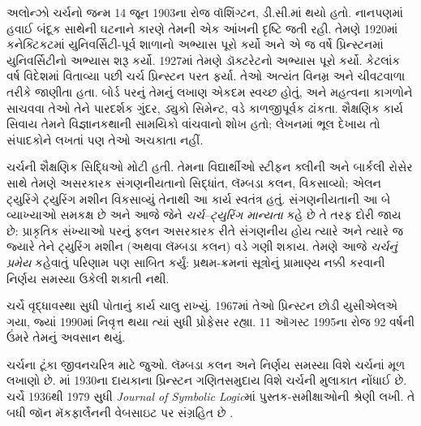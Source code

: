 \documentclass[../../../include/open-logic-section]{subfiles}
\begin{document}



અલોન્ઝો ચર્ચનો જન્મ 14 જૂન 1903ના રોજ
વૉશિંગ્ટન, ડી.સી.માં થયો હતો. નાનપણમાં
હવાઈ બંદૂક સાથેની ઘટનાને કારણે તેમની
એક આંખની દૃષ્ટિ જતી રહી. તેમણે 1920માં
કનેક્ટિકટમાં યુનિવર્સિટી-પૂર્વ શાળાનો અભ્યાસ પૂરો
કર્યો અને એ જ વર્ષે પ્રિન્સ્ટનમાં
યુનિવર્સિટીનો અભ્યાસ શરૂ કર્યો. 1927માં
તેમણે ડૉક્ટરેટનો અભ્યાસ પૂરો કર્યો.
કેટલાંક વર્ષ વિદેશમાં વિતાવ્યા પછી ચર્ચ
પ્રિન્સ્ટન પરત ફર્યા. તેઓ અત્યંત વિનમ્ર
અને ચીવટવાળા તરીકે જાણીતા હતા. બોર્ડ
પરનું તેમનું લખાણ એકદમ સ્વચ્છ હોતું,
અને મહત્વના કાગળોને સાચવવા તેઓ તેને
પારદર્શક ગુંદર, ડ્યુકો સિમેન્ટ, વડે
કાળજીપૂર્વક ઢાંકતા. શૈક્ષણિક કાર્ય
સિવાય તેમને વિજ્ઞાનકથાની સામયિકો
વાંચવાનો શોખ હતો; લેખનમાં ભૂલ દેખાય
તો સંપાદકોને લખતાં પણ તેઓ અચકાતા નહીં.

ચર્ચની શૈક્ષણિક સિદ્ધિઓ મોટી હતી.
તેમના વિદ્યાર્થીઓ સ્ટીફન ક્લીની અને
બાર્કલી રોસેર સાથે તેમણે અસરકારક
સંગણનીયતાનો સિદ્ધાંત, લૅમ્બડા કલન,
વિકસાવ્યો; એલન ટ્યુરિંગે ટ્યુરિંગ
મશીન વિકસાવ્યું તેનાથી આ કાર્ય સ્વતંત્ર
હતું. સંગણનીયતાની આ બે વ્યાખ્યાઓ
સમકક્ષ છે અને આજે જેને
\emph{ચર્ચ--ટ્યુરિંગ માન્યતા} કહે છે
તે તરફ દોરી જાય છે: પ્રાકૃતિક સંખ્યાઓ
પરનું ફલન અસરકારક રીતે સંગણનીય હોય
ત્યારે અને ત્યારે જ જ્યારે તેને
ટ્યુરિંગ મશીન (અથવા લૅમ્બડા કલન)
વડે ગણી શકાય. તેમણે આજે
\emph{ચર્ચનું પ્રમેય} કહેવાતું પરિણામ
પણ સાબિત કર્યું: પ્રથમ-ક્રમનાં સૂત્રોનું
પ્રામાણ્ય નક્કી કરવાની નિર્ણય સમસ્યા
ઉકેલી શકાતી નથી.

ચર્ચે વૃદ્ધાવસ્થા સુધી પોતાનું કાર્ય
ચાલુ રાખ્યું. 1967માં તેઓ પ્રિન્સ્ટન
છોડી યુસીએલએ ગયા, જ્યાં 1990માં
નિવૃત્ત થયા ત્યાં સુધી પ્રોફેસર રહ્યા.
11 ઑગસ્ટ 1995ના રોજ 92 વર્ષની ઉંમરે
તેમનું અવસાન થયું.


\begin{reading}
ચર્ચના ટૂંકા જીવનચરિત્ર માટે
\citet{EndertonND} જુઓ. લૅમ્બડા કલન
અને નિર્ણય સમસ્યા
વિશે ચર્ચનાં મૂળ લખાણો
\citet{Church1936,Church1936a} છે.
\citet{Aspray1984}માં 1930ના દાયકાના
પ્રિન્સ્ટન ગણિતસમુદાય વિશે ચર્ચની
મુલાકાત નોંધાઈ છે. ચર્ચે 1936થી
1979 સુધી \emph{Journal of
Symbolic Logic}માં પુસ્તક-સમીક્ષાઓની
શ્રેણી લખી. તે બધી જૉન મૅકફાર્લેનની
વેબસાઇટ પર સંગ્રહિત છે
\citep{MacFarlane2015}.
\end{reading}
\end{document}

